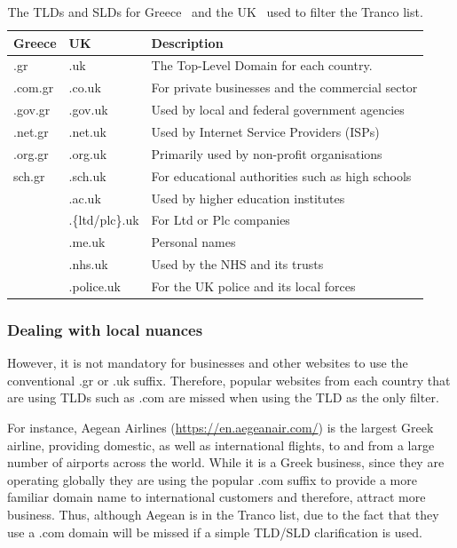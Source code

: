 \documentclass[../main.tex]{subfiles}
\begin{document}
\begin{table}[ht]
\centering
\begin{tabular}{@{}lll@{}}
\toprule
\textbf{Greece} & \textbf{UK}     & \textbf{Description}                                     \\ \midrule
.gr             & .uk             & The Top-Level Domain for each country.                   \\
.com.gr         & .co.uk          & For private businesses and the commercial sector         \\
.gov.gr         & .gov.uk         & Used by local and federal government agencies            \\
.net.gr         & .net.uk         & Used by Internet Service Providers (ISPs)                \\
.org.gr         & .org.uk         & Primarily used by non-profit organisations               \\
sch.gr          & .sch.uk         & For educational authorities such as high schools         \\
                & .ac.uk          & Used by higher education institutes                      \\
                & .\{ltd/plc\}.uk & For Ltd or Plc companies                                 \\
                & .me.uk          & Personal names                                           \\
                & .nhs.uk         & Used by the NHS and its trusts                           \\
                & .police.uk      & For the UK police and its local forces                   \\ \bottomrule
\end{tabular}
\caption{The TLDs and SLDs for Greece~\cite{gr_registar} and the UK~\cite{nominet_additional_domains, nominet_rules} used to filter the Tranco list.}
\label{tab:impl_tlds}
\end{table}

\subsubsection{Dealing with local nuances}
However, it is not mandatory for businesses and other websites to use the conventional .gr or .uk suffix. Therefore, popular websites from each country that are using TLDs such as .com are missed when using the TLD as the only filter. 

For instance, Aegean Airlines (\url{https://en.aegeanair.com/}) is the largest Greek airline, providing domestic, as well as international flights, to and from a large number of airports across the world. While it is a Greek business, since they are operating globally they are using the popular .com suffix to provide a more familiar domain name to international customers and therefore, attract more business. Thus, although Aegean is in the Tranco list, due to the fact that they use a .com domain will be missed if a simple TLD/SLD clarification is used.
\end{document}
